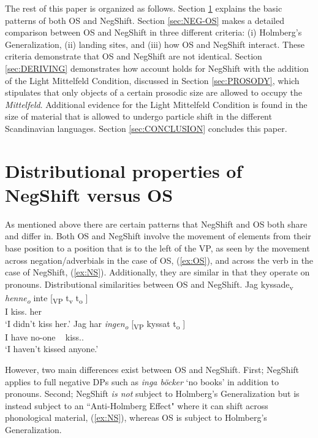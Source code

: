 \documentclass[12pt, letterpaper]{article}
\begin{document}
The rest of this paper is organized as follows. Section \ref{sec:DISTRIBUTION} explains the basic patterns of both OS and NegShift. Section \ref{sec:NEG-OS} makes a detailed comparison between OS and NegShift in three different criteria: (i) Holmberg's Generalization, (ii) landing sites, and (iii) how OS and NegShift interact. These criteria demonstrate that OS and NegShift are not identical. Section \ref{sec:DERIVING} demonstrates how  account holds for NegShift with the addition of the Light Mittelfeld Condition, discussed in Section \ref{sec:PROSODY}, which stipulates that only objects of a certain prosodic size are allowed to occupy the \emph{Mittelfeld}. Additional evidence for the Light Mittelfeld Condition is found in the size of material that is allowed to undergo particle shift in the different Scandinavian languages. Section \ref{sec:CONCLUSION} concludes this paper.

\section{Distributional properties of NegShift versus OS} \label{sec:DISTRIBUTION}

As mentioned above there are certain patterns that NegShift and OS both share and differ in. Both OS and NegShift involve the movement of elements from their base position to a position that is to the left of the VP, as seen by the movement across negation/adverbials in the case of OS, (\ref{ex:OS}), and across the verb in the case of NegShift, (\ref{ex:NS}). Additionally, they are similar in that they operate on pronouns. 
	\ea Distributional similarities between OS and NegShift. 
		\ea \label{ex:OS} {
		\gll Jag kyssade\textsubscript{v} \emph{henne\textsubscript{o}} inte [\textsubscript{VP} t\textsubscript{v} t\textsubscript{o} ] \\
		I kiss.\Pst{} her \Neg{}\\} 
		\glt `I didn't kiss her.'
		\ex \label{ex:NS}
		\gll Jag har \emph{ingen\textsubscript{o}} [\textsubscript{VP} kyssat t\textsubscript{o} ]\\
		I have no-one ~ kiss.\Pst{}.\Ptcp{} \\
		\glt `I haven't kissed anyone.'
		\z 
	\z 

However, two main differences exist between OS and NegShift. First; NegShift applies to full negative DPs such as \textit{inga böcker} `no books' in addition to pronouns. Second; NegShift \emph{is not} subject to Holmberg's Generalization but is instead subject to an ``Anti-Holmberg Effect" where it can shift across phonological material, (\ref{ex:NS}), whereas OS is subject to Holmberg's Generalization. 
\end{document}
